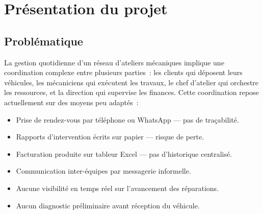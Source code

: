 \documentclass[12pt,a4paper]{report}
\begin{document}
\begin{center}
\end{center}

\section{Présentation du projet}

\subsection{Problématique}

La gestion quotidienne d'un réseau d'ateliers mécaniques implique une coordination
complexe entre plusieurs parties~: les clients qui déposent leurs véhicules, les
mécaniciens qui exécutent les travaux, le chef d'atelier qui orchestre les ressources,
et la direction qui supervise les finances. Cette coordination repose actuellement sur
des moyens peu adaptés~:

\begin{itemize}[noitemsep]
  \item Prise de rendez-vous par téléphone ou WhatsApp — pas de traçabilité.
  \item Rapports d'intervention écrits sur papier — risque de perte.
  \item Facturation produite sur tableur Excel — pas d'historique centralisé.
  \item Communication inter-équipes par messagerie informelle.
  \item Aucune visibilité en temps réel sur l'avancement des réparations.
  \item Aucun diagnostic préliminaire avant réception du véhicule.
\end{itemize}
\end{document}
